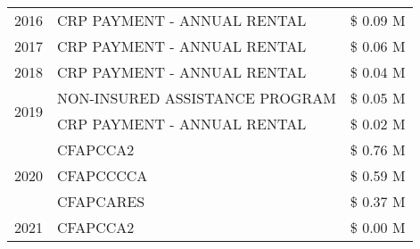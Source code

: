 \begin{tabular}{llr}
\cline{1-3}
2016 & CRP PAYMENT - ANNUAL RENTAL & \$ 0.09 M \\
\cline{1-3}
2017 & CRP PAYMENT - ANNUAL RENTAL & \$ 0.06 M \\
\cline{1-3}
2018 & CRP PAYMENT - ANNUAL RENTAL & \$ 0.04 M \\
\cline{1-3}
\multirow[t]{2}{*}{2019} & NON-INSURED ASSISTANCE PROGRAM & \$ 0.05 M \\
 & CRP PAYMENT - ANNUAL RENTAL & \$ 0.02 M \\
\cline{1-3}
\multirow[t]{3}{*}{2020} & CFAPCCA2 & \$ 0.76 M \\
 & CFAPCCCCA & \$ 0.59 M \\
 & CFAPCARES & \$ 0.37 M \\
\cline{1-3}
2021 & CFAPCCA2 & \$ 0.00 M \\
\cline{1-3}
\bottomrule
\end{tabular}
